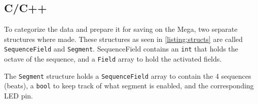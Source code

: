 	\subsection{C/C++}%
		
		To categorize the data and prepare it for saving on the Mega, two separate structures where made. These structures as seen in \autoref{listing:structs} are called \texttt{SequenceField} and \texttt{Segment}. SequenceField contains an \texttt{int} that holds the octave of the sequence, and a \texttt{Field} array to hold the activated fields.
		
		\noindent
		The \texttt{Segment} structure holds a \texttt{SequenceField} array to contain the 4 sequences (beats), a \texttt{bool} to keep track of what segment is enabled, and the corresponding LED pin.
		
